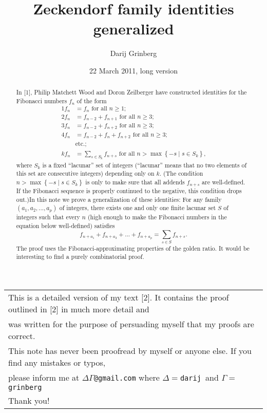 \documentclass[12pt,final,notitlepage,onecolumn]{article}%
\begin{document}


\title{Zeckendorf family identities generalized}
\author{Darij Grinberg}
\date{22 March 2011, long version}
\maketitle

\begin{abstract}
In [1], Philip Matchett Wood and Doron Zeilberger have constructed identities
for the Fibonacci numbers $f_{n}$ of the form%
\begin{align*}
1f_{n} &  =f_{n}\text{ for all }n\geq1;\\
2f_{n} &  =f_{n-2}+f_{n+1}\text{ for all }n\geq3;\\
3f_{n} &  =f_{n-2}+f_{n+2}\text{ for all }n\geq3;\\
4f_{n} &  =f_{n-2}+f_{n}+f_{n+2}\text{ for all }n\geq3;\\
&  \text{etc.;}\\
kf_{n} &  =\sum_{s\in S_{k}}f_{n+s}\text{ for all }n>\max\left\{  -s\mid s\in
S_{k}\right\}  \text{,}%
\end{align*}
where $S_{k}$ is a fixed ``lacunar'' set of integers (``lacunar'' means that no two
elements of this set are consecutive integers) depending only on $k$. (The
condition $n>\max\left\{  -s\mid s\in S_{k}\right\}  $ is only to make sure
that all addends $f_{n+s}$ are well-defined. If the Fibonacci sequence is
properly continued to the negative, this condition drops out.)\newline In this
note we prove a generalization of these identities: For any family $\left(
a_{1},a_{2},...,a_{p}\right)  $ of integers, there exists one and only one
finite lacunar set $S$ of integers such that every $n$ (high enough to make the
Fibonacci numbers in the equation below well-defined) satisfies
\[
f_{n+a_{1}}+f_{n+a_{2}}+...+f_{n+a_{p}}=\sum\limits_{s\in S}f_{n+s}.
\]
The proof uses the Fibonacci-approximating properties of the golden ratio.
It would be interesting to find a purely combinatorial proof.
\end{abstract}

%

\begin{tabular}
[c]{||l||}\hline\hline
This is a detailed version of my text [2]. It contains the proof outlined in
[2] in much more detail and\\
was written for the purpose of persuading myself that my proofs are correct.\\
This note has never been proofread by myself or anyone else. If you find any
mistakes or typos,\\
please inform me at $\Delta\Gamma$\texttt{@gmail.com} where $\Delta
=$\texttt{darij }and $\Gamma=$\texttt{grinberg}\\
Thank you!\\\hline\hline
\end{tabular}
\end{document}
